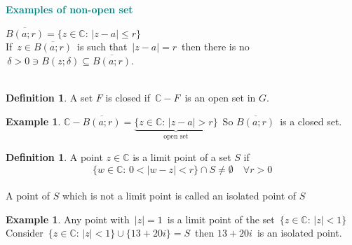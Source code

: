 \documentclass[11pt,a4paper]{article}
\theoremstyle{definition}
\newtheorem{definition}[thm]{Definition}
\newtheorem{example}[thm]{Example}
\begin{document}
\textbf{\textcolor{teal}{Examples of non-open set}}

$\overline{B(a; r)} = \big\{ z \in \mathbb{C}:\, \left|z - a\right| \leq r\big\}$\\

If $\, z \in \overline{B(a; r)}\,$ is such that $\, \left|z - a\right| = r\,$ then there is no $\, \delta > 0 \ni B(z;\delta ) \subseteq \overline{B(a; r)}$.\\\\






\begin{definition}
A set $F$ is closed if $\,\mathbb{C} - F\,$ is an open set in $G$.
\end{definition}

\begin{example}
$\mathbb{C}- \overline{B(a; r)} = \underbrace{\big\{z \in \mathbb{C}: \, \left|z - a\right|> r\big\}}_{\text{open set}}\,$ So $\overline{B(a ; r)}\,$ is a closed set.
\end{example}

\begin{definition}
A point $z \in \mathbb{C}$ is a limit point of a set $S$ if $$\big\{w\in \mathbb{C}: \, 0 < \left|w - z\right| < r\big\} \cap S \neq \emptyset\quad  \forall r > 0$$\\


A point of $S$ which is not a limit point is called an isolated point of $S$



\begin{figure}[H]
\centering
{}
\end{figure}
\end{definition}

\begin{example}
Any point with $\,\left|z\right| = 1\,$ is a limit point of the set $\,\big\{ z \in \mathbb{C}: \, \left|z\right| < 1\big\}$\\


















Consider $\,\big\{ z \in \mathbb{C}: \, \left|z\right| < 1\big\} \cup \big\{ 13 + 20 i\big\} = S\,$ then $13 + 20i\,$ is an isolated point.
\end{example}
\end{document}
